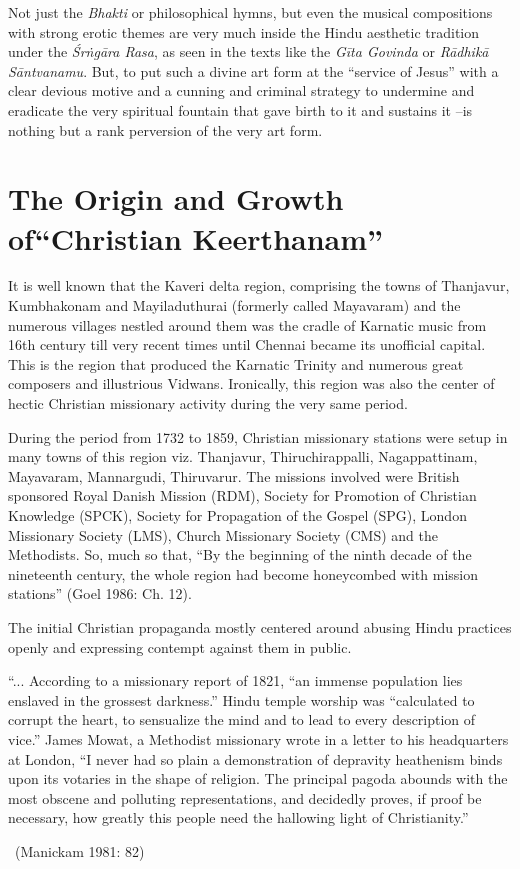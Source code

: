Not just the \textit{Bhakti} or philosophical hymns, but even the musical compositions with strong erotic themes are very much inside the Hindu aesthetic tradition under the \textit{Śrṅgāra Rasa}, as seen in the texts like the \textit{Gīta Govinda} or \textit{Rādhikā Sāntvanamu}. But, to put such a divine art form at the “service of Jesus” with a clear devious motive and a cunning and criminal strategy to undermine and eradicate the very spiritual fountain that gave birth to it and sustains it –is nothing but a rank perversion of the very art form.

\vspace{-.3cm}

\section*{The Origin and Growth of\hfill \break “Christian Keerthanam”}

It is well known that the Kaveri delta region, comprising the towns of Thanjavur, Kumbhakonam and Mayiladuthurai (formerly called Mayavaram) and the numerous villages nestled around them was the cradle of Karnatic music from 16th century till very recent times until Chennai became its unofficial capital. This is the region that produced the Karnatic Trinity and numerous great composers and illustrious Vidwans. Ironically, this region was also the center of hectic Christian missionary activity during the very same period.

During the period from 1732 to 1859, Christian missionary stations were setup in many towns of this region viz. Thanjavur, Thiruchirappalli, Nagappattinam, Mayavaram, Mannargudi, Thiruvarur. The missions involved were British sponsored Royal Danish Mission (RDM), Society for Promotion of Christian Knowledge (SPCK), Society for Propagation of the Gospel (SPG), London Missionary Society (LMS), Church Missionary Society (CMS) and the Methodists. So, much so that, “By the beginning of the ninth decade of the nineteenth century, the whole region had become honeycombed with mission stations” (Goel 1986: Ch. 12).

The initial Christian propaganda mostly centered around abusing Hindu practices openly and expressing contempt against them in public.

\begin{myquote}
“... According to a missionary report of 1821, “an immense population lies enslaved in the grossest darkness.” Hindu temple worship was “calculated to corrupt the heart, to sensualize the mind and to lead to every description of vice.” James Mowat, a Methodist missionary wrote in a letter to his headquarters at London, “I never had so plain a demonstration of depravity heathenism binds upon its votaries in the shape of religion. The principal pagoda abounds with the most obscene and polluting representations, and decidedly proves, if proof be necessary, how greatly this people need the hallowing light of Christianity.” 

~\hfill (Manickam 1981: 82)
\end{myquote}


